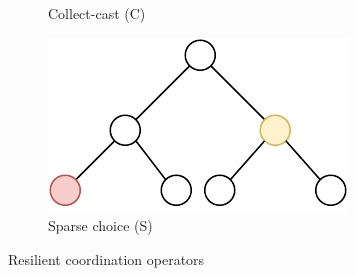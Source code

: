\begin{figure}
\begin{subfigure}{0.3\textwidth}
        \caption{Collect-cast (C)}\label{fig:collect-cast}
    \end{subfigure}
    \begin{subfigure}{0.3\textwidth}
        \centering
        \includegraphics[width=\textwidth]{chapters/img/s.drawio.pdf}
        \caption{Sparse choice (S)}\label{fig:sparse-choice}
    \end{subfigure}
    \caption{Resilient coordination operators}\label{fig:resilient-coordination-operators}
\end{figure}
